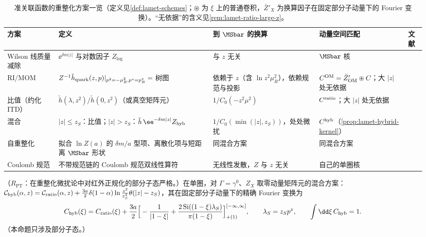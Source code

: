 \begin{table}[htbp]
\centering
\footnotesize
\renewcommand{\arraystretch}{1.12}
\begin{tabularx}{\textwidth}{@{}>{\raggedright\arraybackslash}p{1.8cm}>{\raggedright\arraybackslash}X>{\raggedright\arraybackslash}p{2.75cm}>{\raggedright\arraybackslash}p{2.6cm}>{\raggedright\arraybackslash}p{2.1cm}@{}}
\toprule
方案 & 定义 & 到 $\MSbar$ 的换算 & 动量空间匹配 & 文献 \\
\midrule
Wilson 线质量减除 & $\ee^{\delta m|z|}$ 与对数因子 $Z_{\log}$ & 与 $z$ 无关 & $\MSbar$ 核 & \cite{Chen:2016fxx,Ishikawa:2016znu,Green:2017xeu} \\
RI/MOM & $Z^{-1}\tilde h_{\rm quark}(z,p)|_{p^2=-\mu_R^2,p^z=p^z_R}=$ 树图 & 依赖于 $z$（含 $\ln z^2\mu_R^2$），依赖规范与投影 & $C^{\rm OM}=\bar Z'_{\rm OM}\circledast C$；大 $|z|$ 处无依据 & \cite{Constantinou:2017sej,Stewart:2017tvs,Alexandrou:2017huk,Chen:2017mzz,LatticeParton:2018gjr} \\
比值（约化 ITD） & $\tilde h(\lambda,z^2)/\tilde h(0,z^2)$（或真空矩阵元） & $1/C_0(-z^2\mu^2)$ & $C^{\rm ratio}$；大 $|z|$ 处无依据 & \cite{Radyushkin2017,Orginos:2017kos,Braun:2018brg} \\
混合 & $|z|\le z_S$：比值；$|z|>z_S$：$\tilde h\,\ee^{-\delta m|z|}Z_{\rm hyb}$ & $1/C_0(\min(|z|,z_S))$，处处微扰 & $C^{\rm hyb}$（\cref{prop:lamet-hybrid-kernel}） & \cite{Ji:2020brr} \\
自重整化 & 拟合 $\ln Z(a)$ 的 $\delta m/a$ 型项、离散化项与短距离 $\MSbar$ 形状 & 同混合方案 & 同混合方案 & \cite{LatticePartonLPC:2021gpi} \\
Coulomb 规范 & 不带规范链的 Coulomb 规范双线性算符 & 无线性发散，$Z$ 与 $z$ 无关 & 自己的单圈核 & \cite{Gao:2023lny,Zhao:2023ptv} \\
\bottomrule
\end{tabularx}
\caption{准关联函数的重整化方案一览（定义见\cref{def:lamet-schemes}；$\circledast$ 为 $\xi$ 上的普通卷积，$\bar Z'_X$ 为换算因子在固定部分子动量下的 Fourier 变换）。“无依据”的含义见\cref{rem:lamet-ratio-large-z}。}
\label{tab:lamet-schemes}
\end{table}

\begin{proposition}\label{prop:lamet-hybrid-kernel}
（$R_{\mathrm{PT}}$：在重整化微扰论中对红外正规化的部分子态严格。）在单圈，对 $\Gamma=\gamma^0$、$Z_X$ 取零动量矩阵元的混合方案：$\mathcal C_{\rm hyb}(\alpha,z)=\mathcal C_{\rm ratio}(\alpha,z)+\frac{3a}2\delta(1-\alpha)\ln\frac{z^2}{z_S^2}\theta(|z|-z_S)$，其在固定部分子动量下的精确 Fourier 变换为
\begin{equation}\label{eq:lamet-hybrid-kernel}
C_{\rm hyb}(\xi)=C_{\rm ratio}(\xi)+\frac{3a}2\Big[-\frac1{|1-\xi|}+\frac{2\,{\rm Si}((1-\xi)\lambda_S)}{\pi(1-\xi)}\Big]^{[-\infty,\infty]}_{+(1)},\qquad\lambda_S=z_Sp^z,\qquad\int\dd\xi\,C_{\rm hyb}=1 .
\end{equation}%
（本命题只涉及部分子态。）
\end{proposition}

